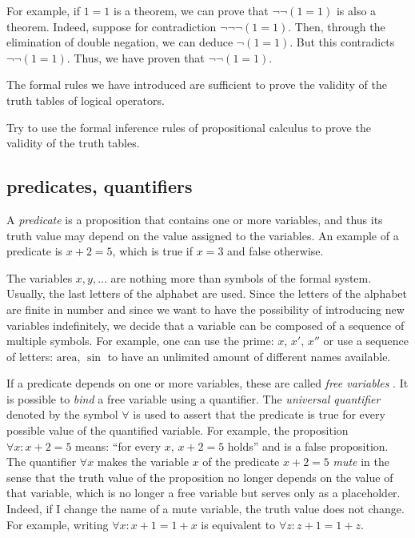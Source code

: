 For example, if $1=1$ is a theorem, we can prove that $\lnot \lnot (1=1)$ is
also a theorem. Indeed, suppose for contradiction $\lnot \lnot \lnot (1=1)$.
Then, through the elimination of double negation, we can deduce $\lnot (1=1)$.
But this contradicts $\lnot \lnot (1=1)$. Thus, we have proven that $\lnot \lnot
(1=1)$.

The formal rules we have introduced are sufficient to prove the validity of the
truth tables of logical operators.

\begin{exercise}
Try to use the formal inference rules of propositional calculus to prove the
validity of the truth tables.
\end{exercise}

\subsection{predicates, quantifiers}

A \emph{predicate}%
%
 is a proposition that contains one or more variables, and thus its truth value may depend on the value assigned to the variables. An example of a predicate is $x+2=5$, which is true if $x=3$ and false otherwise.

The variables $x,y,\dots$ are nothing more than symbols of the formal system.
Usually, the last letters of the alphabet are used. Since the letters of the
alphabet are finite in number and since we want to have the possibility of
introducing new variables indefinitely, we decide that a variable can be
composed of a sequence of multiple symbols. For example, one can use the prime:
$x$, $x'$, $x''$ or use a sequence of letters: $\textrm{area}$, $\sin$ to have
an unlimited amount of different names available.

If a predicate depends on one or more variables, these are called \emph{free
variables}%
%
. It is possible to \emph{bind} a free variable using a quantifier. The \emph{universal quantifier}%
%
 denoted by the symbol $\forall$ is used to assert that the predicate is true for every possible value of the quantified variable. For example, the proposition $\forall x\colon x+2=5$ means: ``for every $x$, $x+2=5$ holds'' and is a false proposition. The quantifier $\forall x$ makes the variable $x$ of the predicate $x+2=5$ \emph{mute} in the sense that the truth value of the proposition no longer depends on the value of that variable, which is no longer a free variable but serves only as a placeholder. Indeed, if I change the name of a mute variable, the truth value does not change. For example, writing $\forall x\colon x+1=1+x$ is equivalent to $\forall z\colon z+1=1+z$.

